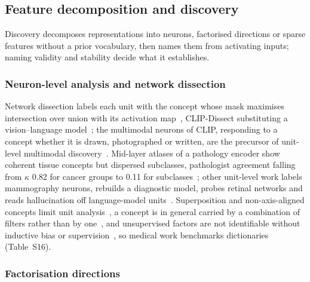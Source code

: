 \subsection{Feature decomposition and discovery}
\label{sec:discovery}

Discovery decomposes representations into neurons, factorised directions or sparse features without a
prior vocabulary, then names them from activating inputs; naming validity and stability decide
what it establishes.

\subsubsection{Neuron-level analysis and network dissection}

Network dissection labels each unit with the concept whose mask maximises intersection over union with
its activation map~\cite{bau2017network}, CLIP-Dissect substituting a vision--language
model~\cite{oikarinen2022clipdissect}; the multimodal neurons of CLIP, responding to a concept whether
it is drawn, photographed or written, are the precursor of unit-level multimodal discovery~\cite{goh2021multimodal}. Mid-layer atlases of a pathology encoder show coherent tissue
concepts but dispersed subclasses, pathologist agreement falling from $\kappa$ 0.82 for cancer groups to
0.11 for subclasses~\cite{gustav2026class}; other unit-level work labels mammography neurons, rebuilds
a diagnostic model, probes retinal networks and reads hallucination off language-model
units~\cite{salahuddin2025mammoclip,gong2025concepts,yousefzadeh2023lava,vankadaru2026readable}.
Superposition and non-axis-aligned concepts limit unit
analysis~\cite{elhage2022toy,park2023linear}, a concept is in general carried by a combination of
filters rather than by one~\cite{fong2018net2vec}, and unsupervised factors are not identifiable without
inductive bias or supervision~\cite{locatello2019challenging}, so medical work benchmarks dictionaries (Table~S16).

\subsubsection{Factorisation directions}

